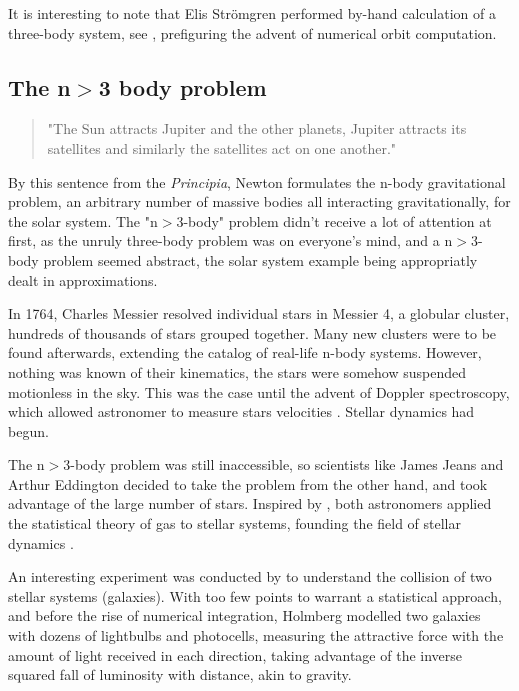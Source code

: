 It is interesting to note that Elis Str\"omgren performed by-hand calculation of a three-body system, see \cite{Aarseth2003,Stromgren1909}, prefiguring the advent of numerical orbit computation.

\subsection*{The n$>$3 body problem}

\begin{quote}
"The Sun attracts Jupiter and the other planets, Jupiter attracts its satellites and similarly the satellites act on one another."
\end{quote}

By this sentence from the \textit{Principia}, Newton formulates the n-body gravitational problem, an arbitrary number of massive bodies all interacting gravitationally, for the solar system. The "n$>$3-body" problem didn't receive a lot of attention at first, as the unruly three-body problem was on everyone's mind, and a n$>$3-body problem seemed abstract, the solar system example being appropriatly dealt in approximations.

In 1764, Charles Messier resolved individual stars in Messier 4, a globular cluster, hundreds of thousands of stars grouped together. Many new clusters were to be found afterwards, extending the catalog of real-life n-body systems. However, nothing was known of their kinematics, the stars were somehow suspended motionless in the sky. This was the case until the advent of Doppler spectroscopy, which allowed astronomer to measure stars velocities \citep{Doppler1842}. Stellar dynamics had begun.

The n$>$3-body problem was still inaccessible, so scientists like James Jeans and Arthur Eddington decided to take the problem from the other hand, and took advantage of the large number of stars. Inspired by \cite{Poincare1906}, both astronomers applied the statistical theory of gas to stellar systems, founding the field of stellar dynamics \citep{Jeans1916,Eddington1916}.

An interesting experiment was conducted by \cite{Holmberg1941} to understand the collision of two stellar systems (galaxies). With too few points to warrant a statistical approach, and before the rise of numerical integration, Holmberg modelled two galaxies with dozens of lightbulbs and photocells, measuring the attractive force with the amount of light received in each direction, taking advantage of the inverse squared fall of luminosity with distance, akin to gravity.

